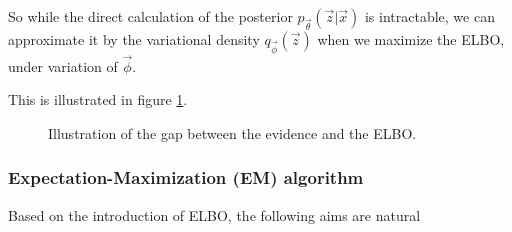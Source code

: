 So while the direct calculation of the posterior $p_{\vec{\theta}}(\vec{z} | \vec{x})$ is intractable, we can
approximate it by the variational density $q_{\vec{\phi}}(\vec{z})$ when we maximize the ELBO, under
variation of $\vec{\phi}$.

This is illustrated in figure \ref{fig:elbo_gap}.

\begin{figure}[!htb]
    \centering
    
    \caption{Illustration of the gap between the evidence and the ELBO.}
    \label{fig:elbo_gap}
\end{figure}


\subsubsection{Expectation-Maximization (EM) algorithm}
Based on the introduction of ELBO, the following aims are natural

